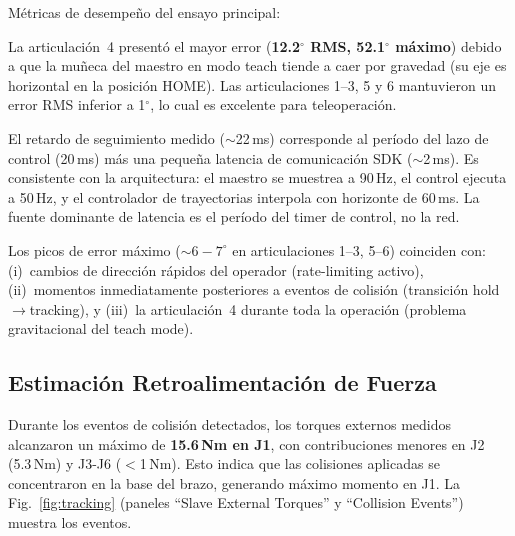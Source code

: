 \documentclass[journal,10pt,twoside]{IEEEtran}
\begin{document}
Métricas de desempeño del ensayo principal:

\smallskip
{}
\smallskip

La articulación~4 presentó el mayor error (\textbf{12.2$^\circ$ RMS, 52.1$^\circ$
máximo}) debido a que la muñeca del maestro en modo teach tiende a
caer por gravedad (su eje es horizontal en la posición HOME). Las
articulaciones 1--3, 5 y 6 mantuvieron un error RMS inferior a
1$^\circ$, lo cual es excelente para teleoperación.

El retardo de seguimiento medido ($\sim$22\,ms)
corresponde al período del lazo de control (20\,ms) más una pequeña
latencia de comunicación SDK ($\sim$2\,ms). Es consistente con la
arquitectura: el maestro se muestrea a 90\,Hz, el control ejecuta a
50\,Hz, y el controlador de trayectorias interpola con horizonte de
60\,ms. La fuente dominante de latencia es el período del timer de
control, no la red.

Los picos de error máximo ($\sim6{-}7^\circ$ en
articulaciones 1--3, 5--6) coinciden con:
(i)~cambios de dirección rápidos del operador (rate-limiting activo),
(ii)~momentos inmediatamente posteriores a eventos de colisión
(transición hold$\to$tracking), y (iii)~la articulación~4 durante toda
la operación (problema gravitacional del teach mode).

\subsection{Estimación  Retroalimentación de Fuerza}


Durante los eventos de colisión detectados, los torques
externos medidos alcanzaron un máximo de \textbf{15.6\,Nm en J1}, con
contribuciones menores en J2 (5.3\,Nm) y J3-J6 ($<$1\,Nm). Esto indica
que las colisiones aplicadas se concentraron en la base del brazo,
generando máximo momento en J1. La Fig.~\ref{fig:tracking} (paneles
``Slave External Torques'' y ``Collision Events'') muestra los eventos.
\end{document}
